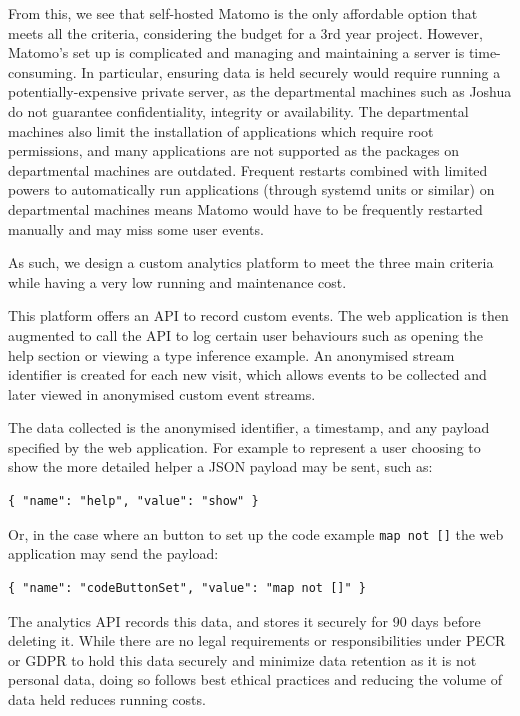 \documentclass[a4paper,fleqn,oneside,12pt]{report}
\begin{document}
From this, we see that self-hosted Matomo is the only affordable option that meets all the criteria, considering the budget for a 3rd year project. However, Matomo's set up is complicated and managing and maintaining a server is time-consuming. In particular, ensuring data is held securely would require running a potentially-expensive private server, as the departmental machines such as Joshua do not guarantee confidentiality, integrity or availability. The departmental machines also limit the installation of applications which require root permissions, and many applications are not supported as the packages on departmental machines are outdated. Frequent restarts combined with limited powers to automatically run applications (through systemd units or similar) on departmental machines means Matomo would have to be frequently restarted manually and may miss some user events.

As such, we design a custom analytics platform to meet the three main criteria while having a very low running and maintenance cost.

This platform offers an API to record custom events. The web application is then augmented to call the API to log certain user behaviours such as opening the help section or viewing a type inference example. An anonymised stream identifier is created for each new visit, which allows events to be collected and later viewed in anonymised custom event streams.

The data collected is the anonymised identifier, a timestamp, and any payload specified by the web application. For example to represent a user choosing to show the more detailed helper a JSON payload may be sent, such as:

\begin{verbatim}
{ "name": "help", "value": "show" }
\end{verbatim}

Or, in the case where an button to set up the code example \texttt{map not []} the web application may send the payload: 

\begin{verbatim}
{ "name": "codeButtonSet", "value": "map not []" }
\end{verbatim}

The analytics API records this data, and stores it securely for 90 days before deleting it. While there are no legal requirements or responsibilities under PECR or GDPR to hold this data securely and minimize data retention as it is not personal data, doing so follows best ethical practices and reducing the volume of data held reduces running costs.
\end{document}
